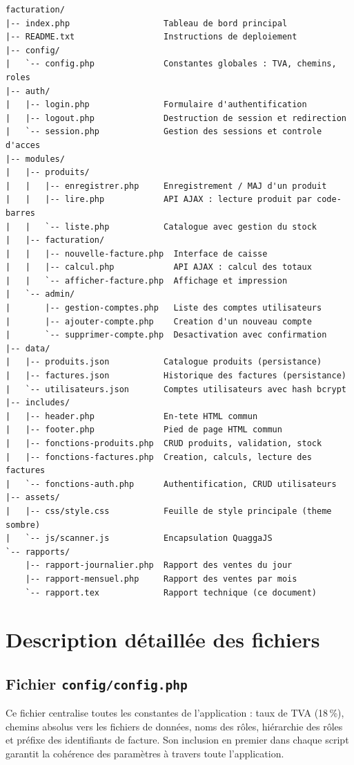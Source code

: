 \documentclass[12pt,a4paper]{report}
\begin{document}
\begin{lstlisting}[caption={Arborescence du projet}]
facturation/
|-- index.php                   Tableau de bord principal
|-- README.txt                  Instructions de deploiement
|-- config/
|   `-- config.php              Constantes globales : TVA, chemins, roles
|-- auth/
|   |-- login.php               Formulaire d'authentification
|   |-- logout.php              Destruction de session et redirection
|   `-- session.php             Gestion des sessions et controle d'acces
|-- modules/
|   |-- produits/
|   |   |-- enregistrer.php     Enregistrement / MAJ d'un produit
|   |   |-- lire.php            API AJAX : lecture produit par code-barres
|   |   `-- liste.php           Catalogue avec gestion du stock
|   |-- facturation/
|   |   |-- nouvelle-facture.php  Interface de caisse
|   |   |-- calcul.php            API AJAX : calcul des totaux
|   |   `-- afficher-facture.php  Affichage et impression
|   `-- admin/
|       |-- gestion-comptes.php   Liste des comptes utilisateurs
|       |-- ajouter-compte.php    Creation d'un nouveau compte
|       `-- supprimer-compte.php  Desactivation avec confirmation
|-- data/
|   |-- produits.json           Catalogue produits (persistance)
|   |-- factures.json           Historique des factures (persistance)
|   `-- utilisateurs.json       Comptes utilisateurs avec hash bcrypt
|-- includes/
|   |-- header.php              En-tete HTML commun
|   |-- footer.php              Pied de page HTML commun
|   |-- fonctions-produits.php  CRUD produits, validation, stock
|   |-- fonctions-factures.php  Creation, calculs, lecture des factures
|   `-- fonctions-auth.php      Authentification, CRUD utilisateurs
|-- assets/
|   |-- css/style.css           Feuille de style principale (theme sombre)
|   `-- js/scanner.js           Encapsulation QuaggaJS
`-- rapports/
    |-- rapport-journalier.php  Rapport des ventes du jour
    |-- rapport-mensuel.php     Rapport des ventes par mois
    `-- rapport.tex             Rapport technique (ce document)
\end{lstlisting}

\section{Description détaillée des fichiers}

\subsection{Fichier \texttt{config/config.php}}
Ce fichier centralise toutes les constantes de l'application : taux de TVA (18\,\%),
chemins absolus vers les fichiers de données, noms des rôles, hiérarchie des rôles
et préfixe des identifiants de facture. Son inclusion en premier dans chaque script
garantit la cohérence des paramètres à travers toute l'application.
\end{document}
